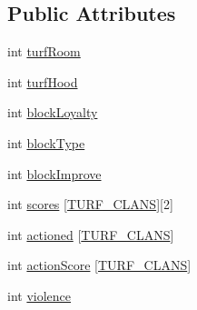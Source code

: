 \subsection*{Public Attributes}
\begin{DoxyCompactItemize}
\item 
int \hyperlink{classBlock_a7d080c6c349d17e582d63405d40ba4b7}{turf\-Room}
\item 
int \hyperlink{classBlock_a174ece7b61ffa487286bdd2fc487c510}{turf\-Hood}
\item 
int \hyperlink{classBlock_a70dbb5221f0c068954a6d43b72a54eca}{block\-Loyalty}
\item 
int \hyperlink{classBlock_a108050a7570c5c5d1de1b83f42a265dc}{block\-Type}
\item 
int \hyperlink{classBlock_ad35fa4c92d80803155062dbd44f53af7}{block\-Improve}
\item 
int \hyperlink{classBlock_a4d1441123e6e6cc6d12184fc6e639186}{scores} \mbox{[}\hyperlink{structs_8h_acfd70c8e304a61f3865e64234b2993f7}{T\-U\-R\-F\-\_\-\-C\-L\-A\-N\-S}\mbox{]}\mbox{[}2\mbox{]}
\item 
int \hyperlink{classBlock_ab23e6326ffa446b8879cff0a7672dd9a}{actioned} \mbox{[}\hyperlink{structs_8h_acfd70c8e304a61f3865e64234b2993f7}{T\-U\-R\-F\-\_\-\-C\-L\-A\-N\-S}\mbox{]}
\item 
int \hyperlink{classBlock_af4947e7e95b6a9a6ad312658f02142f3}{action\-Score} \mbox{[}\hyperlink{structs_8h_acfd70c8e304a61f3865e64234b2993f7}{T\-U\-R\-F\-\_\-\-C\-L\-A\-N\-S}\mbox{]}
\item 
int \hyperlink{classBlock_ab0df0d90035b29fed825caa9f8008bab}{violence}
\end{DoxyCompactItemize}


